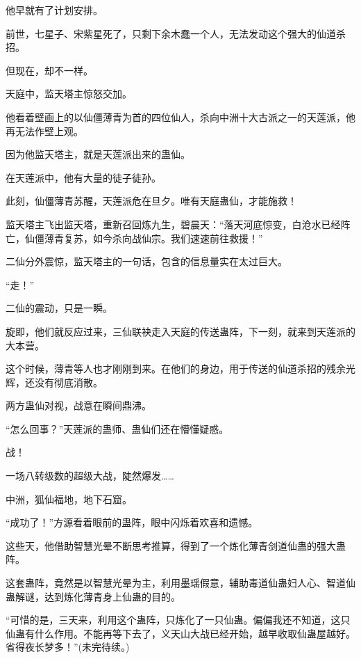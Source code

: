 \begin{this_body}
他早就有了计划安排。

前世，七星子、宋紫星死了，只剩下余木蠢一个人，无法发动这个强大的仙道杀招。

但现在，却不一样。

天庭中，监天塔主惊怒交加。

他看着壁画上的以仙僵薄青为首的四位仙人，杀向中洲十大古派之一的天莲派，他再无法作壁上观。

因为他监天塔主，就是天莲派出来的蛊仙。

在天莲派中，他有大量的徒子徒孙。

此刻，仙僵薄青苏醒，天莲派危在旦夕。唯有天庭蛊仙，才能施救！

监天塔主飞出监天塔，重新召回炼九生，碧晨天：“落天河底惊变，白沧水已经阵亡，仙僵薄青复苏，如今杀向战仙宗。我们速速前往救援！”

二仙分外震惊，监天塔主的一句话，包含的信息量实在太过巨大。

“走！”

二仙的震动，只是一瞬。

旋即，他们就反应过来，三仙联袂走入天庭的传送蛊阵，下一刻，就来到天莲派的大本营。

这个时候，薄青等人也才刚刚到来。在他们的身边，用于传送的仙道杀招的残余光辉，还没有彻底消散。

两方蛊仙对视，战意在瞬间鼎沸。

“怎么回事？”天莲派的蛊师、蛊仙们还在懵懂疑惑。

战！

一场八转级数的超级大战，陡然爆发……

中洲，狐仙福地，地下石窟。

“成功了！”方源看着眼前的蛊阵，眼中闪烁着欢喜和遗憾。

这些天，他借助智慧光晕不断思考推算，得到了一个炼化薄青剑道仙蛊的强大蛊阵。

这套蛊阵，竟然是以智慧光晕为主，利用墨瑶假意，辅助毒道仙蛊妇人心、智道仙蛊解谜，达到炼化薄青身上仙蛊的目的。

“可惜的是，三天来，利用这个蛊阵，只炼化了一只仙蛊。偏偏我还不知道，这只仙蛊有什么作用。不能再等下去了，义天山大战已经开始，越早收取仙蛊屋越好。省得夜长梦多！”(未完待续。)

\end{this_body}

